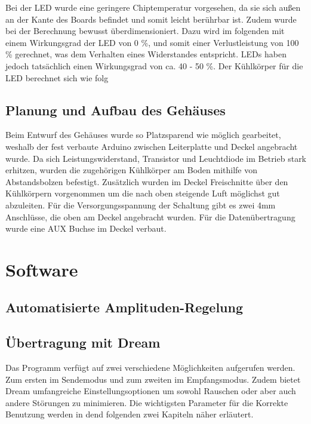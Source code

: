 Bei der LED wurde eine geringere Chiptemperatur vorgesehen, da sie sich außen
an der Kante des Boards befindet und somit leicht berührbar ist. Zudem wurde
bei der Berechnung bewusst überdimensioniert. Dazu wird im folgenden mit einem
Wirkungsgrad der LED von 0 \%, und somit einer Verlustleistung von 100  \%
gerechnet, was dem Verhalten eines Widerstandes entspricht. LEDs haben jedoch
tatsächlich einen Wirkungsgrad von ca. 40 - 50 \%.
Der Kühlkörper für die LED berechnet sich wie folg

\subsection{Planung und Aufbau des Gehäuses}
\label{subsec:Unterabschnitt12}

Beim Entwurf des Gehäuses wurde so Platzsparend wie möglich gearbeitet, weshalb
der fest verbaute Arduino zwischen Leiterplatte und Deckel angebracht wurde.
Da sich Leistungswiderstand, Transistor und Leuchtdiode im Betrieb stark erhitzen,
wurden die zugehörigen Kühlkörper am Boden mithilfe von Abstandsbolzen
befestigt. Zusätzlich wurden im Deckel Freischnitte über den Kühlkörpern vorgenommen
um die nach oben steigende Luft möglichst gut abzuleiten. Für die
Versorgungsspannung der Schaltung gibt es zwei 4mm Anschlüsse, die oben am
Deckel angebracht wurden. Für die Datenübertragung wurde eine AUX Buchse im
Deckel verbaut.

\section{Software}
\label{sec:Software}
\subsection{Automatisierte Amplituden-Regelung}
\label{subsec:Unterabschnitt12}


\subsection{Übertragung mit Dream}
\label{subsec:dream}

Das Programm verfügt auf zwei verschiedene Möglichkeiten aufgerufen werden. Zum ersten im Sendemodus und zum zweiten im Empfangsmodus. Zudem bietet Dream umfangreiche Einstellungsoptionen um sowohl Rauschen oder aber auch andere Störungen zu minimieren. Die wichtigsten Parameter für die Korrekte Benutzung werden in dend
folgenden zwei Kapiteln näher erläutert.



